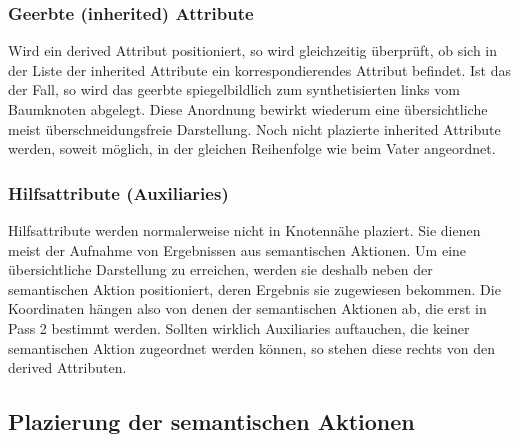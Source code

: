 \subsubsection{Geerbte (inherited) Attribute}

Wird ein derived Attribut positioniert, so wird gleichzeitig \"uberpr\"uft, ob sich in der Liste der inherited Attribute ein korrespondierendes
Attribut befindet. Ist das der Fall, so wird das geerbte spiegelbildlich zum synthetisierten links vom Baumknoten abgelegt. Diese Anordnung bewirkt
wiederum eine \"ubersichtliche meist \"uberschneidungsfreie Darstellung. Noch nicht plazierte inherited Attribute werden, soweit m\"oglich, in der
gleichen Reihenfolge wie beim Vater angeordnet.

\subsubsection{Hilfsattribute (Auxiliaries)}

Hilfsattribute werden normalerweise nicht in Knotenn\"ahe plaziert. Sie dienen meist der Aufnahme von Ergebnissen aus semantischen Aktionen. Um eine
\"ubersichtliche Darstellung zu erreichen, werden sie deshalb neben der semantischen Aktion positioniert, deren Ergebnis sie zugewiesen bekommen. Die
Koordinaten h\"angen also von denen der semantischen Aktionen ab, die erst in Pass 2 bestimmt werden. Sollten wirklich Auxiliaries auftauchen, die keiner
semantischen Aktion zugeordnet werden k\"onnen, so stehen diese rechts von den derived Attributen.

\subsection{Plazierung der semantischen Aktionen}


